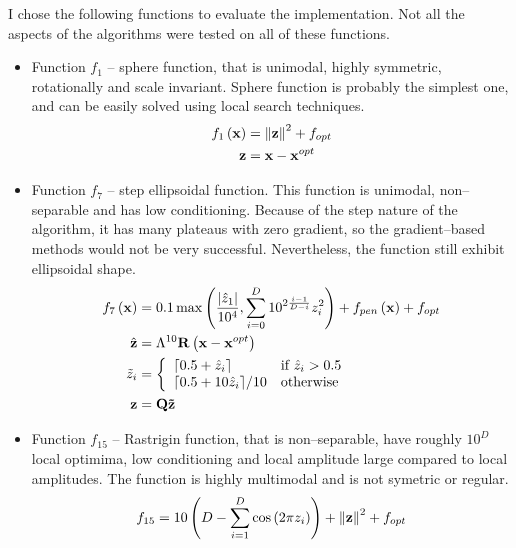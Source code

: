 I chose the following functions to evaluate the implementation. Not all the aspects of the algorithms were tested on all of these functions.
\begin{itemize}
    \item Function $f_1$ -- sphere function, that is unimodal, highly symmetric, rotationally and scale invariant. Sphere function is probably the simplest one, and can be easily solved using local search techniques.
    \begin{align*}
        f_{1}\left(\mathbf{x}\right) &= \left\lVert\mathbf{z}\right\rVert^2+f_{opt} \\
        \mathbf{z} &= \mathbf{x} - \mathbf{x}^{opt}
    \end{align*}
    \item Function $f_7$ -- step ellipsoidal function. This function is unimodal, non--separable and has low conditioning. Because of the step nature of the algorithm, it has many plateaus with zero gradient, so the gradient--based methods would not be very successful. Nevertheless, the function still exhibit ellipsoidal shape. 
    \begin{align*}
        f_{7}\left(\mathbf{x}\right) &= 0.1\max\left( \frac{\abs{\hat{z}_1}}{10^4}, \sum_{i=0}^D 10^{2\frac{i-1}{D-i}}z_i^2 \right) + f_{pen}\left( \mathbf{x} \right)+f_{opt} \\
        \hat{\mathbf{z}} &= \Lambda^{10}\mathbf{R} \left( \mathbf{x} - \mathbf{x}^{opt} \right) \\
        \tilde{z}_i &=\left\{ 
            \begin{array}{ll}
                \lceil 0.5 + \hat{z}_i \rceil       & \text{if}\ \hat{z}_i>0.5 \\
                \lceil 0.5 + 10\hat{z}_i\rceil / 10 & \text{otherwise}        \\
            \end{array}  
            \right. \\
        \mathbf{z} &= \mathbf{Q}\mathbf{\tilde{z}} 
    \end{align*}
    \item Function $f_{15}$ -- Rastrigin function, that is non--separable, have roughly $10^D$ local optimima, low conditioning and local amplitude large compared to local amplitudes. The function is highly multimodal and is not symetric or regular.
    \begin{align*}
        f_{15} &= 10\left( D-\sum_{i=1}^D \cos\left(2 \pi z_i\right) \right) + \norm{\mathbf{z}}^2+f_{opt} \\

\end{align*}
\end{itemize}
